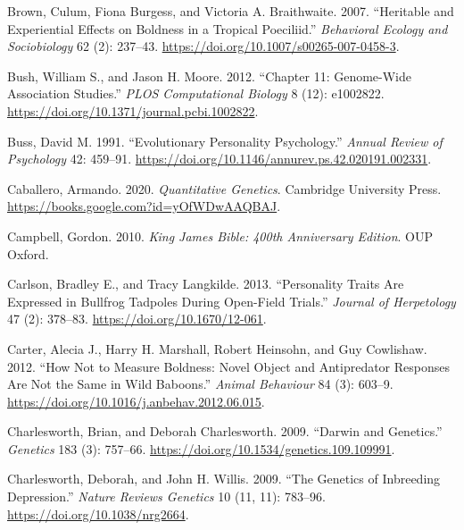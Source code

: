 \documentclass[
]{book}
\newlength{\cslhangindent}
\newlength{\cslentryspacingunit} %
\newenvironment{CSLReferences}[2] %
 {%
  \setlength{\parindent}{0pt}
  \ifodd #1
  \let\oldpar\par
  \def\par{\hangindent=\cslhangindent\oldpar}
  \fi
  \setlength{\parskip}{#2\cslentryspacingunit}
 }%
 {}
\begin{document}
\begin{CSLReferences}{1}{0}
\leavevmode{}%
Brown, Culum, Fiona Burgess, and Victoria A. Braithwaite. 2007. {``Heritable and Experiential Effects on Boldness in a Tropical Poeciliid.''} \emph{Behavioral Ecology and Sociobiology} 62 (2): 237--43. \url{https://doi.org/10.1007/s00265-007-0458-3}.

\leavevmode{}%
Bush, William S., and Jason H. Moore. 2012. {``Chapter 11: {Genome-Wide Association Studies}.''} \emph{PLOS Computational Biology} 8 (12): e1002822. \url{https://doi.org/10.1371/journal.pcbi.1002822}.

\leavevmode{}%
Buss, David M. 1991. {``Evolutionary Personality Psychology.''} \emph{Annual Review of Psychology} 42: 459--91. \url{https://doi.org/10.1146/annurev.ps.42.020191.002331}.

\leavevmode{}%
Caballero, Armando. 2020. \emph{Quantitative {Genetics}}. {Cambridge University Press}. \url{https://books.google.com?id=yOfWDwAAQBAJ}.

\leavevmode{}%
Campbell, Gordon. 2010. \emph{King {James Bible}: 400th {Anniversary Edition}}. {OUP Oxford}.

\leavevmode{}%
Carlson, Bradley E., and Tracy Langkilde. 2013. {``Personality {Traits Are Expressed} in {Bullfrog Tadpoles} During {Open-Field Trials}.''} \emph{Journal of Herpetology} 47 (2): 378--83. \url{https://doi.org/10.1670/12-061}.

\leavevmode{}%
Carter, Alecia J., Harry H. Marshall, Robert Heinsohn, and Guy Cowlishaw. 2012. {``How Not to Measure Boldness: Novel Object and Antipredator Responses Are Not the Same in Wild Baboons.''} \emph{Animal Behaviour} 84 (3): 603--9. \url{https://doi.org/10.1016/j.anbehav.2012.06.015}.

\leavevmode{}%
Charlesworth, Brian, and Deborah Charlesworth. 2009. {``Darwin and {Genetics}.''} \emph{Genetics} 183 (3): 757--66. \url{https://doi.org/10.1534/genetics.109.109991}.

\leavevmode{}%
Charlesworth, Deborah, and John H. Willis. 2009. {``The Genetics of Inbreeding Depression.''} \emph{Nature Reviews Genetics} 10 (11, 11): 783--96. \url{https://doi.org/10.1038/nrg2664}.


\end{CSLReferences}
\end{document}
